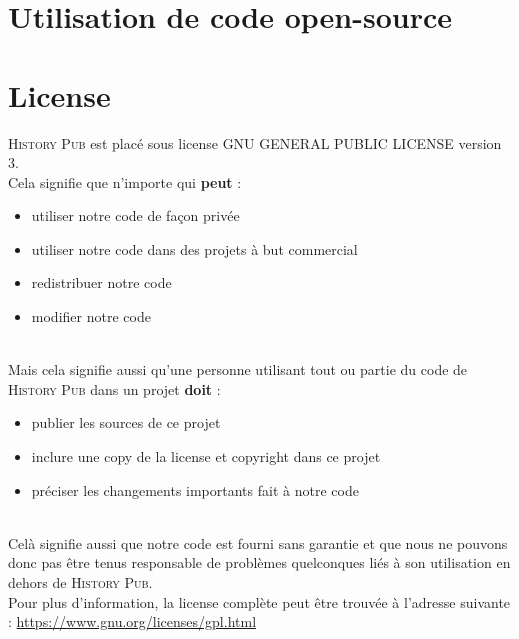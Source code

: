 \documentclass[11pt]{scrreprt}
\begin{document}
    \chapter{Utilisation de code open-source}

    \chapter{License}

    \noindent \textsc{History Pub} est placé sous license GNU GENERAL PUBLIC LICENSE version 3.
    \hfill\\

    \noindent Cela signifie que n'importe qui \textbf{peut} :
    \begin{itemize}
        \item utiliser notre code de façon privée
        \item utiliser notre code dans des projets à but commercial
        \item redistribuer notre code
        \item modifier notre code
    \end{itemize}
    \hfill\\
    Mais cela signifie aussi qu'une personne utilisant tout ou partie du code de \textsc{History Pub} dans un projet \textbf{doit} :
    \begin{itemize}
        \item publier les sources de ce projet
        \item inclure une copy de la license et copyright dans ce projet
        \item préciser les changements importants fait à notre code
    \end{itemize}
    \hfill\\
    Celà signifie aussi que notre code est fourni sans garantie et que nous ne pouvons donc pas être tenus responsable de problèmes quelconques liés à son utilisation en dehors de \textsc{History Pub}.
    \hfill\\

    \noindent Pour plus d'information, la license complète peut être trouvée à l'adresse suivante : \url{https://www.gnu.org/licenses/gpl.html}
\end{document}
